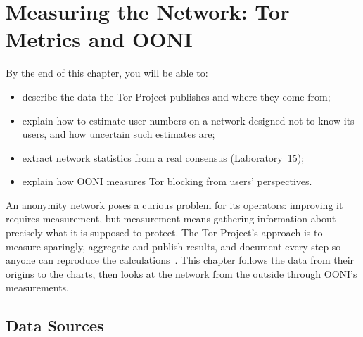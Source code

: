 \chapter{Measuring the Network: Tor Metrics and OONI}\label{cap:24-metrics}

\begin{obiettivi}
By the end of this chapter, you will be able to:
\begin{itemize}[nosep]
  \item describe the data the Tor Project publishes and where they come from;
  \item explain how to estimate user numbers on a network designed not to know its users, and how uncertain such estimates are;
  \item extract network statistics from a real consensus (Laboratory~15);
  \item explain how OONI measures Tor blocking from users' perspectives.
\end{itemize}
\end{obiettivi}

An anonymity network poses a curious problem for its operators: improving it requires measurement, but measurement means gathering information about precisely what it is supposed to protect. The Tor Project's approach is to measure sparingly, aggregate and publish results, and document every step so anyone can reproduce the calculations~\cite{metricsreproducible}. This chapter follows the data from their origins to the charts, then looks at the network from the outside through OONI's measurements.

\section{Data Sources}\label{sec:metrics-fonti}

